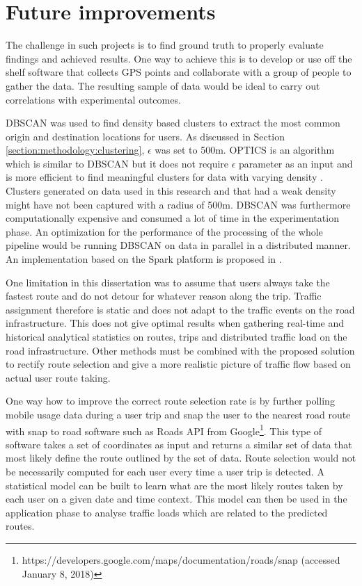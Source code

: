\documentclass[12pt, a4paper]{report}
\theoremstyle{definition}
\theoremstyle{definition}%
\theoremstyle{definition}%
\theoremstyle{definition}%
\theoremstyle{definition}%
\theoremstyle{definition}%
\begin{document}
\section{Future improvements} \label{section:future_improvements}


The challenge in such projects is to find ground truth to properly evaluate findings and achieved results. One way to achieve this is to develop or use off the shelf software that collects GPS points and collaborate with a group of people to gather the data. The resulting sample of data would be ideal to carry out correlations with experimental outcomes.

DBSCAN was used to find density based clusters to extract the most common origin and destination locations for users. As discussed in Section \ref{section:methodology:clustering}, $\epsilon$ was set to 500m. OPTICS is an algorithm which is similar to DBSCAN but it does not require $\epsilon$ parameter as an input and is more efficient to find meaningful clusters for data with varying density \cite{Ankerst1999}. Clusters generated on data used in this research and that had a weak density might have not been captured with a radius of 500m. DBSCAN was furthermore computationally expensive and consumed a lot of time in the experimentation phase. An optimization for the performance of the processing of the whole pipeline would be running DBSCAN on data in parallel in a distributed manner. An implementation based on the Spark platform is proposed in \cite{huang2017research}.

One limitation in this dissertation was to assume that users always take the fastest route and do not detour for whatever reason along the trip. Traffic assignment therefore is static and does not adapt to the traffic events on the road infrastructure. This does not give optimal results when gathering real-time and historical analytical statistics on routes, trips and distributed traffic load on the road infrastructure. Other methods must be combined with the proposed solution to rectify route selection and give a more realistic picture of traffic flow based on actual user route taking. 

One way how to improve the correct route selection rate is by further polling mobile usage data during a user trip and snap the user to the nearest road route with snap to road software such as Roads API from Google\footnote{https://developers.google.com/maps/documentation/roads/snap (accessed January 8, 2018)}. This type of software takes a set of coordinates as input and returns a similar set of data that most likely define the route outlined by the set of data. Route selection would not be necessarily computed for each user every time a user trip is detected. A statistical model can be built to learn what are the most likely routes taken by each user on a given date and time context. This model can then be used in the application phase to analyse traffic loads which are related to the predicted routes.
\end{document}

